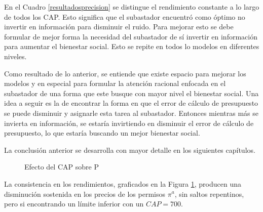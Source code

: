 En el Cuadro \ref{resultadosprecision} se distingue el rendimiento constante a lo largo de todos los CAP. Esto significa que el subastador encuentró como óptimo no invertir en información para disminuir el ruido. Para mejorar esto se debe formular de mejor forma la necesidad del subastador de sí invertir en información para aumentar el bienestar social. Esto se repite en todos lo modelos en diferentes niveles.
\vspace{2.5mm}

Como resultado de lo anterior, se entiende que existe espacio para mejorar los modelos y en especial para formular la atención racional enfocada en el subastador de una forma que este busque con mayor nivel el bienestar social. Una idea a seguir es la de encontrar la forma en que el error de cálculo de presupuesto se puede disminuir y asignarle esta tarea al subastador. Entonces mientras más se invierta en información, se estaría invirtiendo en disminuir el error de cálculo de presupuesto, lo que estaría buscando un mejor bienestar social.
\vspace{2.5mm}

La conclusión anterior se desarrolla con mayor detalle en los siguientes capítulos.
\vspace{2.5mm}


\begin{figure}[H]
\centering
{}
\caption{{\footnotesize Efecto del CAP sobre P}}
\label{rendcapMP}
\end{figure}

La consistencia en los rendimientos, graficados en la Figura \ref{rendcapMP}, producen una disminución sostenida en los precios de los permisos $\pi^a$, sin saltos repentinos, pero si encontrando un límite inferior con un $CAP=700$.
\vspace{2.5mm}

